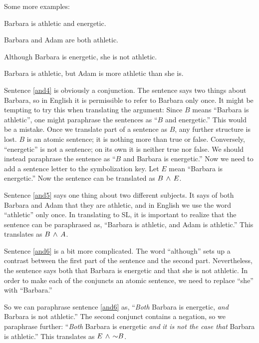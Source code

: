 Some more examples:
\begin{earg}
\item[\ex{and4}]Barbara is athletic and energetic.
\item[\ex{and5}]Barbara and Adam are both athletic.
\item[\ex{and6}]Although Barbara is energetic, she is not athletic.
\item[\ex{and7}]Barbara is athletic, but Adam is more athletic than she is.
\end{earg}

Sentence \ref{and4} is obviously a conjunction. The sentence says two things about Barbara, so in English it is permissible to refer to Barbara only once. It might be tempting to try this when translating the argument: Since $B$ means ``Barbara is athletic'', one might paraphrase the sentences as ``$B$ and energetic.'' This would be a mistake. Once we translate part of a sentence as $B$, any further structure is lost. $B$ is an atomic sentence; it is nothing more than true or false. Conversely, ``energetic'' is not a sentence; on its own it is neither true nor false. We should instead paraphrase the sentence as ``$B$ and Barbara is energetic.'' Now we need to add a sentence letter to the symbolization key. Let $E$ mean ``Barbara is energetic.'' Now the sentence can be translated as $B \,\land\, E$.


Sentence \ref{and5} says one thing about two different subjects. It says of both Barbara and Adam that they are athletic, and in English we use the word ``athletic'' only once. In translating to SL, it is important to realize that the sentence can be paraphrased as, ``Barbara is athletic, and Adam is athletic.'' This translates as $B \,\land\, A$.

Sentence \ref{and6} is a bit more complicated. The word ``although'' sets up a contrast between the first part of the sentence and the second part. Nevertheless, the sentence says both that Barbara is energetic and that she is not athletic. In order to make each of the conjuncts an atomic sentence, we need to replace ``she'' with ``Barbara.''

So we can paraphrase sentence \ref{and6} as, ``\emph{Both} Barbara is energetic, \emph{and} Barbara is not athletic.'' The second conjunct contains a negation, so we paraphrase further: ``\emph{Both} Barbara is energetic \emph{and} \emph{it is not the case that} Barbara is athletic.'' This translates as $E \,\land\, \mathord{\sim} B$.

